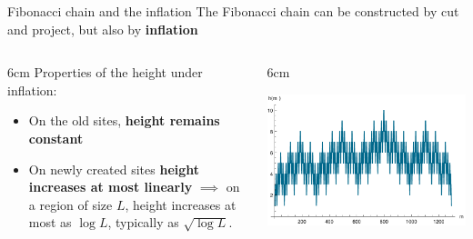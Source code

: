 \documentclass[xcolor=x11names,compress,professionalfonts]{beamer}
\renewcommand{\(}{\begin{columns}}
\renewcommand{\)}{\end{columns}}
\newcommand{\<}[1]{\begin{column}{#1}}
\renewcommand{\>}{\end{column}}
\begin{document}
\begin{frame}{Fibonacci chain and the inflation}
The Fibonacci chain can be constructed by cut and project, but also by \textbf{inflation}

{
\centering

}

\begin{columns}
\<{6cm}
Properties of the height under inflation:
\begin{itemize}
	\item On the old sites, \textbf{height remains constant}
	\item On newly created sites \textbf{height increases at most linearly} $\implies$ on a region of size $L$, height increases at most as $\log L$, typically as $\sqrt{\log L}$.
\end{itemize}
\>

\<{6cm}
{\centering
\includegraphics[scale=.5]{img/heights.pdf}

}
\>
\end{columns}

\end{frame}
\end{document}
